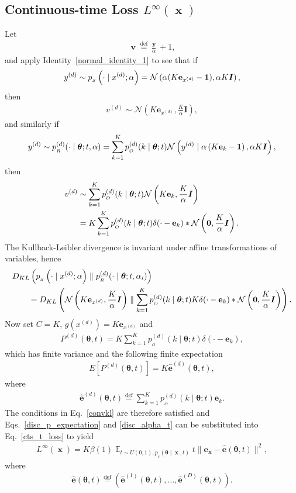 \documentclass[11pt,table]{article}
\DeclareMathOperator*{\E}{\mathbb{E}}
\DeclareMathOperator{\x}{\mathbf{x}}
\DeclareMathOperator{\y}{\mathbf{y}}
\DeclareMathOperator{\vv}{\mathbf{v}}
\newcommand{\kl}[2]{D_{KL}\left(#1 \parallel #2\right)}
\newcommand{\N}[2]{\mathcal{N}\left(#1 , #2\right)}
\newcommand{\I}[1]{\boldsymbol{I}}
\newcommand*{\defeq}{\stackrel{\text{def}}{=}}
\newcommand{\tidx}[2]{#1_{#2}}
\newcommand{\didx}[2]{#1^{(#2)}}
\renewcommand{\vec}[1]{\boldsymbol{#1}}
\newcommand{\pars}{\theta}
\newcommand{\parsn}{\vec{\pars}}
\newcommand{\alphat}[1]{\tidx{\alpha}{#1}}
\newcommand{\0}[1]{\constvec{0}{#1}}
\newcommand{\1}[1]{\constvec{1}{#1}}
\newcommand{\yd}{y}
\newcommand{\ydd}[1]{\didx{\yd}{#1}}
\newcommand{\xdd}[1]{\didx{x}{#1}}
\newcommand{\oh}[2]{\mathbf{e}_{#1}}
\newcommand{\sender}[2]{p_{_S}\left(#1 \mid #2\right)}
\newcommand{\out}{p_{_O}}
\newcommand{\rec}{p_{_R}}
\newcommand{\flow}{p_{_F}}
\newcommand{\pred}[1]{\hat{#1}}
\begin{document}
\subsection{Continuous-time Loss \texorpdfstring{$L^{\infty}(\x)$}{}}
Let
\begin{align}
\vv \defeq \frac{\y}{\alpha} + 1,
\end{align}
and apply Identity~\ref{normal_identity_1} to see that if
\begin{align}
\ydd{d} \sim \sender{\cdot}{\xdd{d}; \alpha} = \N{\alpha(K\oh{\xdd{d}}{K} - \1{K})}{\alpha K\I{K}},
\end{align}
then
\begin{align}
\didx{v}{d} \sim \N{K\oh{\xdd{d}}{K}}{\frac{K}{\alpha}\I{K}},
\end{align}
and similarly if
\begin{align}
\ydd{d} \sim \rec^{(d)}(\cdot \mid \parsn; t, \alpha) = \sum_{k=1}^K \out^{(d)}(k \mid \parsn; t) \N{\ydd{d} \mid \alpha\left(K\oh{k}{K}- \1{K}\right)}{\alpha K \I{K}},
\end{align}
then 
\begin{align}
\didx{v}{d} &\sim \sum_{k=1}^K \out^{(d)}(k \mid \parsn; t)\N{K\oh{k}{K}}{\frac{K}{\alpha}\I{K}}\\
&= K\sum_{k=1}^K \out^{(d)}(k \mid \parsn; t) \delta(\cdot - \oh{k}{K}) \ast \N{\0{K}}{\frac{K}{\alpha}\I{K}}.
\end{align}
The Kullback-Leibler divergence is invariant under affine transformations of variables, hence
\begin{align}
&\kl{\sender{\cdot}{\xdd{d}; \alpha}}{\rec^{(d)}(\cdot \mid \parsn; t, \alphat{i})}\\
&\qquad= \kl{\N{K\oh{\xdd{d}}{K}}{\frac{K}{\alpha}\I{K}}}{\sum_{k=1}^K \out^{(d)}(k \mid \parsn; t)K \delta(\cdot - \oh{k}{K}) \ast \N{\0{K}}{\frac{K}{\alpha}\I{K}}}.
\end{align}
Now set $C=K$, $g(\xdd{d}) = K \oh{\xdd{d}}{K}$ and
\begin{align}
P^{(d)}(\parsn, t) = K \sum_{k=1}^K \out^{(d)}(k \mid \parsn; t) \delta(\cdot - \oh{k}{K}),
\end{align}
which has finite variance and the following finite expectation
\begin{align}
E[P^{(d)}(\parsn, t)] = K \mathbf{\pred{e}}^{(d)}(\parsn, t),\label{disc_p_expectation}
\end{align}
where
\begin{align}
\mathbf{\pred{e}}^{(d)}(\parsn, t) \defeq \sum_{k=1}^K \out^{(d)}(k \mid \parsn; t)\oh{k}{K}.
\end{align}
The conditions in Eq.~\ref{convkl} are therefore satisfied and Eqs.~\ref{disc_p_expectation} and \ref{disc_alpha_t} can be substituted into Eq.~\ref{cts_t_loss} to yield
\begin{align}
L^{\infty}(\x) = K \beta(1) \E_{t\sim U(0,1),\flow(\parsn \mid \x, t)} t \|\oh{\x}{KD} - \mathbf{\pred{e}}(\parsn, t)\|^2,
\end{align}
where
\begin{align}
\mathbf{\pred{e}}(\parsn, t) \defeq \left(\mathbf{\pred{e}}^{(1)}(\parsn, t),\dots,\mathbf{\pred{e}}^{(D)}(\parsn, t)\right).
\end{align}
\end{document}
